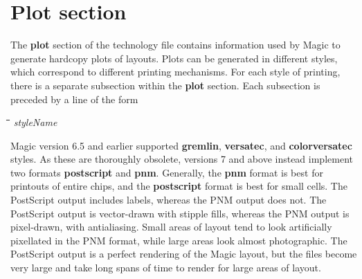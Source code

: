 \documentclass[letterpaper,twoside,12pt]{article}
\def\hinch{\hspace*{0.5in}}
\def\starti{\begin{center}\begin{tabbing}\hinch\=\hinch\=\hinch\=\hinch\=\kill}
\def\endi{\end{tabbing}\end{center}}
\def\ii{\>\>\>}
\begin{document}
\section{Plot section}

The {\bfseries plot} section of the technology file contains information
used by Magic to generate hardcopy plots of layouts.  Plots can
be generated in different styles, which correspond to different
printing mechanisms.  For each style of printing, there is a separate
subsection within the {\bfseries plot} section.  Each subsection is
preceded by a line of the form

\starti
   \ii {\bfseries style} {\itshape styleName}
\endi

Magic version 6.5 and earlier supported {\bfseries gremlin},
{\bfseries versatec}, and {\bfseries colorversatec} styles.  As these
are thoroughly obsolete, versions 7 and above instead implement
two formats {\bfseries postscript} and {\bfseries pnm}.  Generally,
the {\bfseries pnm} format is best for printouts of entire chips, and
the {\bfseries postscript} format is best for small cells.  The
PostScript output includes labels, whereas the PNM output does not.
The PostScript output is vector-drawn with stipple fills, whereas the
PNM output is pixel-drawn, with antialiasing.  Small areas of layout
tend to look artificially pixellated in the PNM format, while large
areas look almost photographic.  The PostScript output is a perfect
rendering of the Magic layout, but the files become very large and
take long spans of time to render for large areas of layout.

\end{document}
